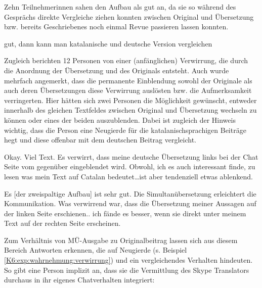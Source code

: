 Zehn Teilnehmer{\textperiodcentered}innen sahen den Aufbau als gut an, da sie so während des Gesprächs direkte Vergleiche ziehen konnten zwischen Original und Übersetzung bzw. bereits Geschriebenes noch einmal Revue passieren lassen konnten.

\begin{example}
	\label{K6:exp:wahrnehmung:vergleichen}
	gut, dann kann man katalanische und deutsche Version vergleichen
\end{example}

\begin{sloppypar}
Zugleich berichten 12 Personen von einer (anfänglichen) Verwirrung, die durch die Anordnung der Übersetzung und des Originals entsteht. Auch wurde mehrfach angemerkt, dass die permanente Einblendung sowohl der Originale als auch deren Übersetzungen diese Verwirrung auslösten bzw. die Aufmerksamkeit verringerten. Hier hätten sich zwei Personen die Möglichkeit gewünscht, entweder innerhalb des gleichen Textfeldes zwischen Original und Übersetzung wechseln zu können oder eines der beiden auszublenden. Dabei ist zugleich der Hinweis wichtig, dass die Person eine Neugierde für die katalanischsprachigen Beiträge hegt und diese offenbar mit dem deutschen Beitrag vergleicht.  
\end{sloppypar}

\begin{example}
	\label{K6:exp:wahrnehmung:verwirrung}
		Okay. Viel Text. Es verwirrt, dass meine deutsche Übersetzung links bei der Chat Seite vom gegenüber eingeblendet wird. Obwohl, ich es auch interessant finde, zu lesen was mein Text auf Catalan bedeutet\dots ist aber tendenziell etwas ablenkend.
\end{example}

\begin{example}
	\label{K6:exp:wahrnehmung:verwirrung2}
	Es [der zweispaltige Aufbau] ist sehr gut. Die Simultanübersetzung erleichtert die Kommunikation. Was verwirrend war, dass die Übersetzung meiner Aussagen auf der linken Seite erschienen.. ich fände es besser, wenn sie direkt unter meinem Text auf der rechten Seite erscheinen.
\end{example}

Zum Verhältnis von MÜ-Ausgabe zu Originalbeitrag lassen sich aus diesem Bereich Antworten erkennen, die auf Neugierde (s. Beispiel\,\ref{K6:exp:wahrnehmung:verwirrung}) und ein vergleichendes Verhalten hindeuten. So gibt eine Person implizit an, dass sie die Vermittlung des Skype Translators durchaus in ihr eigenes Chatverhalten integriert:

